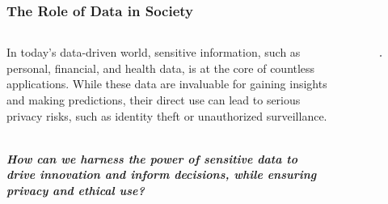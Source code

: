 \documentclass{beamer}
\begin{document}
\begin{frame}
\frametitle{The Role of Data in Society}
\begin{columns}[T] %
    \begin{column}{0.6\textwidth}
        In today’s data-driven world, sensitive information, such as personal, financial, and health data, is at the core of countless applications. 
        While these data are invaluable for gaining insights and making predictions, their direct use can lead to serious privacy risks, such as identity theft or unauthorized surveillance.

        \begin{center}
            \textbf{\textit{\\How can we harness the power of sensitive data to drive innovation and inform decisions, while ensuring privacy and ethical use?}}
        \end{center}
        
    \end{column}
    \begin{column}{0.4\textwidth}
        \begin{figure}
            \centering
            \bigskip
            \medskip
            \includegraphics[width=\linewidth]{slide2.png}
        \end{figure}
    \end{column}
\end{columns}
\end{frame}
\end{document}
